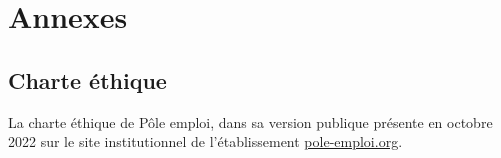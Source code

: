 
\chapter[Annexes]{Annexes}

\section{Charte éthique} \label{A:charte_pe}
La charte éthique de Pôle emploi, dans sa version publique présente en octobre 2022 sur le site institutionnel de l'établissement \url{pole-emploi.org}.

